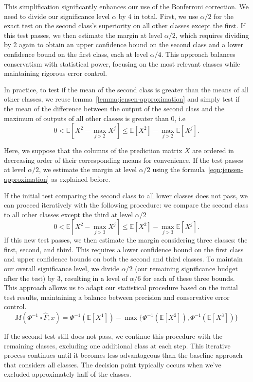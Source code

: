 This simplification significantly enhances our use of the Bonferroni correction.
We need to divide our significance level $\alpha$ by 4 in total.
First, we use $\alpha/2$ for the exact test on the second class's superiority on all other classes except the first.
If this test passes, we then estimate the margin at level $\alpha/2$, which requires dividing by 2 again to obtain an upper confidence bound on the second class and a lower confidence bound on the first class, each at level $\alpha/4$.
This approach balances conservatism with statistical power, focusing on the most relevant classes while maintaining rigorous error control.

In practice, to test if the mean of the second class is greater than the means of all other classes, we reuse lemma~\ref{lemma:jensen-approximation} and simply test if the mean of the difference between the output of the second class and the maximum of outputs of all other classes is greater than $0$, i.e
\[
    0 < \mathbb{E}[X^2 - \max_{j > 2} X^j] \leq \mathbb{E}[X^2] - \max_{j > 2} \mathbb{E}[X^j].
\]

Here, we suppose that the columns of the prediction matrix $X$ are ordered in decreasing order of their corresponding means for convenience.
If the test passes at level $\alpha/2$, we estimate the margin at level $\alpha/2$ using the formula~\eqref{eqn:jensen-approximation} as explained before.

If the initial test comparing the second class to all lower classes does not pass, we can proceed iteratively with the following procedure: we compare the second class to all other classes except the third at level $\alpha/2$
\[
    0 < \mathbb{E}[X^2 - \max_{j > 3} X^j] \leq \mathbb{E}[X^2] - \max_{j > 3} \mathbb{E}[X^j].
\]
If this new test passes, we then estimate the margin considering three classes: the first, second, and third.
This requires a lower confidence bound on the first class and upper confidence bounds on both the second and third classes.
To maintain our overall significance level, we divide $\alpha/2$ (our remaining significance budget after the test) by 3, resulting in a level of $\alpha/6$ for each of these three bounds.
This approach allows us to adapt our statistical procedure based on the initial test results, maintaining a balance between precision and conservative error control.
\[
    M(\Phi^{-1}\circ\hat{F},x) = \Phi^{-1}\left(\mathbb{E}[X^1]\right) - \max\{\Phi^{-1}\left(\mathbb{E}[X^2]\right), \Phi^{-1}\left(\mathbb{E}[X^3]\right)\}
\]

If the second test still does not pass, we continue this procedure with the remaining classes, excluding one additional class at each step.
This iterative process continues until it becomes less advantageous than the baseline approach that considers all classes.
The decision point typically occurs when we've excluded approximately half of the classes.

